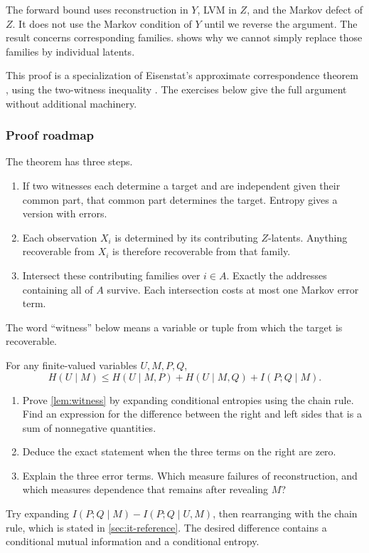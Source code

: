 \documentclass[11pt]{article}
\begin{document}
The forward bound uses reconstruction in $Y$, LVM in $Z$, and the Markov
defect of $Z$.
It does not use the Markov condition of $Y$ until we reverse the argument.
The result concerns corresponding families.  shows why we cannot simply
replace those families by individual latents.

This proof is a specialization of Eisenstat's approximate correspondence
theorem \citep[Theorem~6.8]{eisenstat2025condensation}, using the two-witness
inequality \citep[Lemma~6.4]{eisenstat2025condensation}.
The exercises below give the full argument without additional machinery.

\subsubsection{Proof roadmap}
The theorem has three steps.
\begin{enumerate}
\item If two witnesses each determine a target and are independent given their
common part, that common part determines the target. Entropy gives a version
with errors.
\item Each observation $X_i$ is determined by its contributing $Z$-latents.
Anything recoverable from $X_i$ is therefore recoverable from that family.
\item Intersect these contributing families over $i\in A$. Exactly the
addresses containing all of $A$ survive. Each intersection costs at most one
Markov error term.
\end{enumerate}
The word ``witness'' below means a variable or tuple from which the target is
recoverable.

\begin{lemma}
\label{lem:witness}
For any finite-valued variables $U,M,P,Q$,
\begin{equation}
 H(U\mid M)\le H(U\mid M,P)+H(U\mid M,Q)+I(P;Q\mid M).
 \label{eq:witness}
\end{equation}
\end{lemma}

\begin{exercise}
\label{ex:witness}\important
\begin{enumerate}
\item Prove \cref{lem:witness} by expanding conditional entropies using the
chain rule. Find an expression for the difference between the right and left
sides that is a sum of nonnegative quantities.
\item Deduce the exact statement when the three terms on the right are zero.
\item Explain the three error terms. Which measure failures of reconstruction,
and which measures dependence that remains after revealing $M$?
\end{enumerate}
\end{exercise}
\begin{hint}
Try expanding $I(P;Q\mid M)-I(P;Q\mid U,M)$, then rearranging with the
chain rule, which is stated in
\cref{sec:it-reference}.
The desired difference contains a conditional mutual information
and a conditional entropy.
\end{hint}
\end{document}

